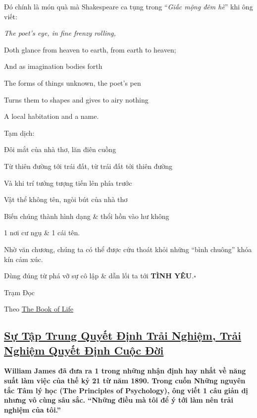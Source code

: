 \documentclass{article}
\begin{document}
%
Đó chính là món quà mà Shakespeare ca tụng trong ``\textit{Giấc mộng đêm hè}'' khi ông viết:
\begin{center}
	\it
	The poet's eye, in fine frenzy rolling,
	
	Doth glance from heaven to earth, from earth to heaven;
	
	And as imagination bodies forth
	
	The forms of things unknown, the poet's pen
	
	Turns them to shapes and gives to airy nothing
	
	A local habitation and a name.
\end{center}
Tạm dịch:
\begin{center}
	\it
	
	Đôi mắt của nhà thơ, lăn điên cuồng
	
	Từ thiên đường tới trái đất, từ trái đất tới thiên đường
	
	Và khi trí tưởng tượng tiến lên phía trước 
	
	Vật thể không tên, ngòi bút của nhà thơ
	
	Biến chúng thành hình dạng \& thổi hồn vào hư không
	
	1 nơi cư ngụ \& 1 cái tên.
\end{center}
Nhờ văn chương, chúng ta có thể được cứu thoát khỏi những ``bình chuông'' khóa kín cảm xúc.

Dùng đúng từ phá vỡ sự cô lập \& dẫn lối ta tới \textbf{TÌNH YÊU}.\hfill$\square$

\begin{flushright}
	Trạm Đọc
	
	Theo \href{http://www.thebookoflife.org/how-words-help-us-to-feel-things/}{The Book of Life}
\end{flushright}


\subsection{\href{http://tramdoc.vn/tin-tuc/su-tap-trung-quyet-dinh-trai-nghiem-trai-nghiem-quyet-dinh-cuoc-doi-nMOYnW.html}{Sự Tập Trung Quyết Định Trải Nghiệm, Trải Nghiệm Quyết Định Cuộc Đời}}

\textbf{William James đã đưa ra 1 trong những nhận định hay nhất về năng suất làm việc của thế kỷ 21 từ năm 1890. Trong cuốn Những nguyên tắc Tâm lý học (The Principles of Psychology), ông viết 1 câu giản dị nhưng vô cùng sâu sắc. ``Những điều mà tôi để ý tới làm nên trải nghiệm của tôi.''}
\end{document}
